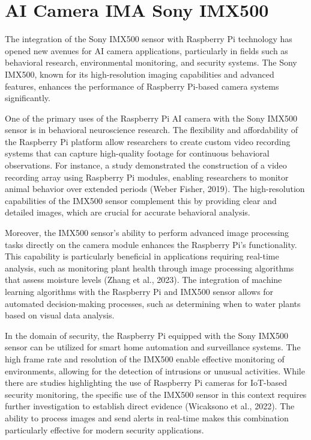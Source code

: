 \documentclass{article}
\begin{document}
\section{AI Camera IMA Sony IMX500}

The integration of the Sony IMX500 sensor with Raspberry 
Pi technology has opened new avenues for AI camera 
applications, particularly in fields such as behavioral 
research, environmental monitoring, and security systems. 
The Sony IMX500, known for its high-resolution imaging 
capabilities and advanced features, enhances the 
performance of Raspberry Pi-based camera systems significantly.

One of the primary uses of the Raspberry Pi AI camera with the 
Sony IMX500 sensor is in behavioral neuroscience research. 
The flexibility and affordability of the Raspberry Pi 
platform allow researchers to create custom video recording 
systems that can capture high-quality footage for 
continuous behavioral observations. For instance, 
a study demonstrated the construction of a video 
recording array using Raspberry Pi modules, enabling 
researchers to monitor animal behavior over extended 
periods (Weber Fisher, 2019). The high-resolution 
capabilities of the IMX500 sensor complement this by 
providing clear and detailed images, which are crucial for 
accurate behavioral analysis.

Moreover, the IMX500 sensor's ability to perform 
advanced image processing tasks directly on the camera module 
enhances the Raspberry Pi's functionality. 
This capability is particularly beneficial in applications 
requiring real-time analysis, such as monitoring plant 
health through image processing algorithms that assess 
moisture levels (Zhang et al., 2023). The integration 
of machine learning algorithms with the Raspberry Pi 
and IMX500 sensor allows for automated decision-making 
processes, such as determining when to water plants 
based on visual data analysis.

In the domain of security, the Raspberry Pi equipped with 
the Sony IMX500 sensor can be utilized for smart home 
automation and surveillance systems. The high frame rate 
and resolution of the IMX500 enable effective monitoring 
of environments, allowing for the detection of intrusions 
or unusual activities. While there are studies highlighting 
the use of Raspberry Pi cameras for IoT-based security 
monitoring, the specific use of the IMX500 sensor in this 
context requires further investigation to establish direct 
evidence (Wicaksono et al., 2022). The ability to process 
images and send alerts in real-time makes this combination 
particularly effective for modern security applications.
\end{document}
